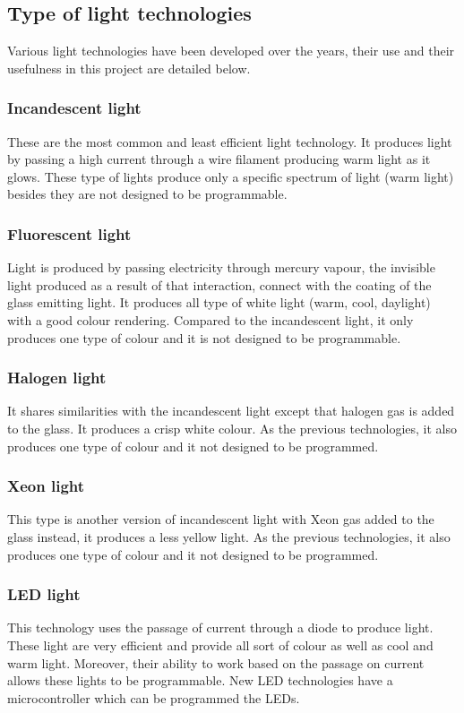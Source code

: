 \subsection{Type of light technologies}
Various light technologies have been developed over the years, their use and their usefulness in this project are detailed below. 
\subsubsection{Incandescent light}
These are the most common and least efficient light technology. It produces light by passing a high current through a wire filament producing warm light as it glows. These type of lights produce only a specific spectrum of light (warm light) besides they are not designed to be programmable. 
\subsubsection{Fluorescent light}
Light is produced by passing electricity through mercury vapour, the invisible light produced as a result of that interaction, connect with the coating of the glass emitting light. It produces all type of white light (warm, cool, daylight) with a good colour rendering. Compared to the incandescent light, it only produces one type of colour and it is not designed to be programmable.
\subsubsection{Halogen light}
It shares similarities with the incandescent light except that halogen gas is added to the glass. It produces a crisp white colour. As the previous technologies, it also produces one type of colour and it not designed to be programmed.
\subsubsection{Xeon light}
This type is another version of incandescent light with Xeon gas added to the glass instead, it produces a less yellow light. As the previous technologies, it also produces one type of colour and it not designed to be programmed.
\subsubsection{LED light}
This technology uses the passage of current through a diode to produce light. These light are very efficient and provide all sort of colour as well as cool and warm light. Moreover, their ability to work based on the passage on current allows these lights to be programmable. New LED technologies have a microcontroller which can be programmed the LEDs. 
